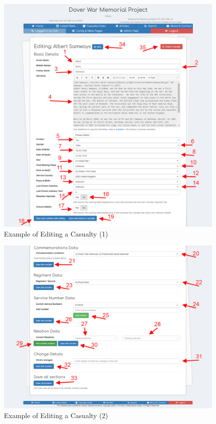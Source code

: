 \documentclass[12pt]{article}
\begin{document}
\begin{figure}[h]
  \centering
 \includegraphics[width=.9\textwidth]{pics/edit_casualty.png}
	\caption{Example of Editing a Casualty (1)}\label{fig:edit_casualty}
\end{figure}

\begin{figure}[h]
  \centering
 \includegraphics[width=.9\textwidth]{pics/edit_casualty2.png}
	\caption{Example of Editing a Casualty (2)}\label{fig:edit_casualty2}
\end{figure}
\end{document}
